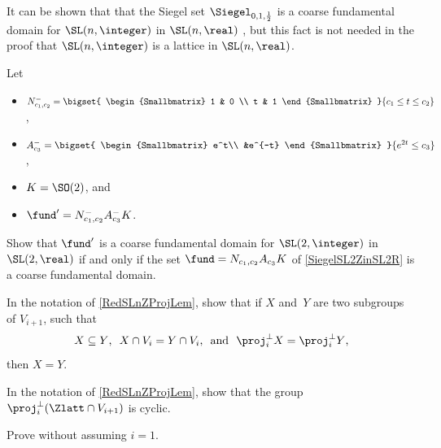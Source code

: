\begin{rem} \label{SiegelIsCoarseFundInSLnR}
	It can be shown that that the Siegel set $\Siegel_{0,1,\frac{1}{2}}$ is a coarse fundamental domain for $\SL(n,\integer)$ in $\SL(n,\real)$ , but this fact is not needed in the proof that $\SL(n,\integer)$ is a lattice in $\SL(n,\real)$.
\end{rem}

\begin{exercises}

\item\label{FundDomSL2ZinSL2RminEx}
Let
	\begin{itemize}
	\item $N^-_{c_1,c_2} = \bigset{
	\begin{Smallbmatrix} 1 & 0 \\ t & 1 \end{Smallbmatrix}
	}{
	c_1 \le t \le c_2}$, 
	\smallskip %
	\item $A^-_{c_3} = \bigset{
	\begin{Smallbmatrix} e^t\\ &e^{-t} \end{Smallbmatrix}
	}{
	e^{2t} \le c_3}$,
	\smallskip %
	\item $K = \SO(2)$,
	and
	\item $\fund' = N^-_{c_1,c_2} A^-_{c_3} K $.
	\end{itemize}
Show that $\fund'$ is a coarse fundamental domain for $\SL(2,\integer)$ in $\SL(2,\real)$ if and only if the set $\fund = N_{c_1,c_2} A_{c_3} K$ of \cref{SiegelSL2ZinSL2R} is a coarse fundamental domain.

\item \label{RedSLnZProjX=YEx}
In the notation of \cref{RedSLnZProjLem}, show that if $X$ and~$Y$ are two subgroups of $V_{i+1}$, such that 
	$$ \text{$X \subseteq Y$, 
	\ $X \cap V_i = Y \cap V_i$,
	\ and
	\ $\proj_i^\perp X = \proj_i^\perp Y$,} $$
then $X = Y$.

\item \label{RedSLnZProjCyclicEx}
In the notation of \cref{RedSLnZProjLem}, show that the group $\proj_i^\perp(\Zlatt \cap V_{i+1})$ is cyclic.

\item \label{RedSLnZProj>1/2Ex}
Prove  without assuming $i = 1$.


\end{exercises}
